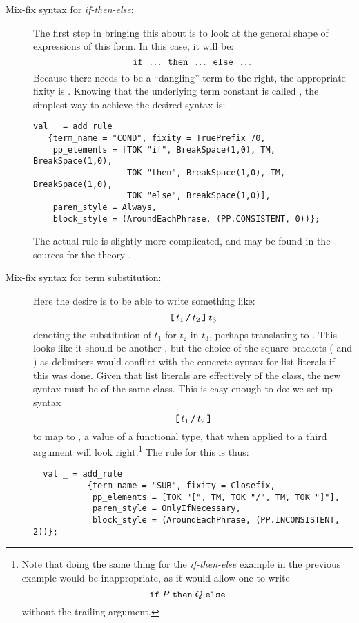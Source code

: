 \begin{description}
\item[Mix-fix syntax for {\it if-then-else}:]
%
The first step in bringing this about is to look at the general shape
of expressions of this form.  In this case, it will be:
%
\[
  \holtxt{if}\;\; \dots \;\;\holtxt{then}\;\;\dots\;\;
  \holtxt{else}\;\;\dots
  \]
%
 Because there needs to be a ``dangling'' term to the right, the
  appropriate fixity is .  Knowing that the underlying
  term constant is called , the simplest way to achieve
  the desired syntax is:
\begin{verbatim}
val _ = add_rule
   {term_name = "COND", fixity = TruePrefix 70,
    pp_elements = [TOK "if", BreakSpace(1,0), TM, BreakSpace(1,0),
                   TOK "then", BreakSpace(1,0), TM, BreakSpace(1,0),
                   TOK "else", BreakSpace(1,0)],
    paren_style = Always,
    block_style = (AroundEachPhrase, (PP.CONSISTENT, 0))};
\end{verbatim}
\noindent The actual rule is slightly more complicated, and
may be found in the sources for the theory .

\item[Mix-fix syntax for term substitution:]

Here the desire is to be able to write something like:
\[
  \mbox{\texttt{[}}\,t_1\,\mbox{\texttt{/}}\,t_2\,\mbox{\texttt{]}}\,t_3
\]
denoting the substitution of $t_1$ for $t_2$ in $t_3$, perhaps
translating to .  This looks
like it should be another , but the choice of the
square brackets (\holtxt{[} and \holtxt{]}) as delimiters would
conflict with the concrete syntax for list literals if this was done.
Given that list literals are effectively of the 
class, the new syntax must be of the same class.  This is easy enough
to do: we set up syntax
\[
\holtxt{[}\,t_1\,\holtxt{/}\,t_2\,\holtxt{]}
\]
to map to , a value of a functional
type, that when applied to a third argument will look
right.\footnote{Note that doing the same thing for the
  \textit{if-then-else} example in the previous example would be
  inappropriate, as it would allow one to write
\[ \holtxt{if}\;P\;\holtxt{then}\;Q\;\holtxt{else} \]
without the trailing argument.}
The rule for this is thus:
\begin{verbatim}
  val _ = add_rule
           {term_name = "SUB", fixity = Closefix,
            pp_elements = [TOK "[", TM, TOK "/", TM, TOK "]"],
            paren_style = OnlyIfNecessary,
            block_style = (AroundEachPhrase, (PP.INCONSISTENT, 2))};
\end{verbatim}

\end{description}

